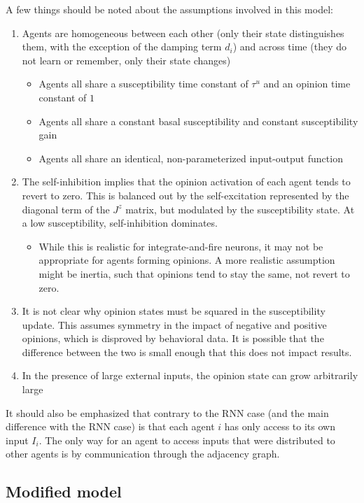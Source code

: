 \documentclass[]{article}
\begin{document}
A few things should be noted about the assumptions involved in this model:
\begin{enumerate}
	\item Agents are homogeneous between each other (only their state distinguishes them, with the exception of the damping term $d_i$) and across time (they do not learn or remember, only their state changes)
	\begin{itemize}
		\item Agents all share a susceptibility time constant of $\tau^u$ and an opinion time constant of $1$ 
		\item Agents all share a constant basal susceptibility and constant susceptibility gain
		\item Agents all share an identical, non-parameterized input-output function 
	\end{itemize}
	\item The self-inhibition implies that the opinion activation of each agent tends to revert to zero. This is balanced out by the self-excitation represented by the diagonal term of the $J^z$ matrix, but modulated by the susceptibility state. At a low susceptibility, self-inhibition dominates. 
	\begin{itemize}
		\item While this is realistic for integrate-and-fire neurons, it may not be appropriate for agents forming opinions. A more realistic assumption might be inertia, such that opinions tend to stay the same, not revert to zero.
	\end{itemize}
	\item It is not clear why opinion states must be squared in the susceptibility update. This assumes symmetry in the impact of negative and positive opinions, which is disproved by behavioral data. It is possible that the difference between the two is small enough that this does not impact results. 
	\item In the presence of large external inputs, the opinion state can grow arbitrarily large
\end{enumerate}

It should also be emphasized that contrary to the RNN case (and the main difference with the RNN case) is that each agent $i$ has only access to its own input $I_i$. The only way for an agent to access inputs that were distributed to other agents is by communication through the adjacency graph.

\subsection{Modified model}
\end{document}
